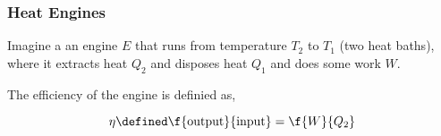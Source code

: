\documentclass{article}
\begin{document}
\subsubsection{Heat Engines}

Imagine a an engine $E$ that runs from temperature $T_2$ to $T_1$ (two heat baths), where it extracts heat $Q_2$ and disposes heat $Q_1$ and does some work $W$.

\begin{center}
\end{center}

The efficiency of the engine is definied as,

\[ \eta \defined \f{\text{output}}{\text{input}} = \f{W}{Q_2} \]
\end{document}
